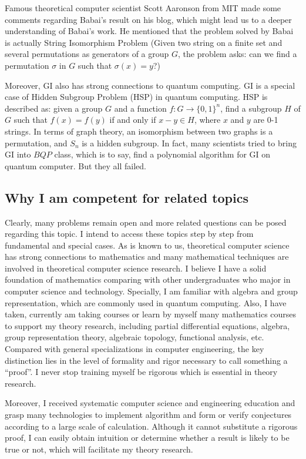 \documentclass[12pt]{article}
\begin{document}
Famous theoretical computer scientist Scott Aaronson from MIT made some comments regarding Babai’s result on his blog\cite{aaronson}, which might lead us to a deeper understanding of Babai’s work. He mentioned that the problem solved by Babai is actually String Isomorphism Problem (Given two string on a finite set and several permutations as generators of a group $G$, the problem asks: can we find a permutation $\sigma$ in $G$ such that $\sigma(x)=y$?) 

Moreover, GI also has strong connections to quantum computing. GI is a special case of Hidden Subgroup Problem (HSP) in quantum computing. HSP is described as: given a group $G$ and a function $f:G \to \{0,1\}^n$, find a subgroup $H$ of $G$ such that $f(x)=f(y)$ if and only if $x-y\in H$, where $x$ and $y$ are 0-1 strings. In terms of graph theory, an isomorphism between two graphs is a permutation, and $S_n$ is a hidden subgroup. In fact, many scientists tried to bring GI into $BQP$ class, which is to say, find a polynomial algorithm for GI on quantum computer. But they all failed. 

\bigskip

\subsection{Why I am competent for related topics}
Clearly, many problems remain open and more related questions can be posed regarding this topic. I intend to access these topics step by step from fundamental and special cases. As is known to us, theoretical computer science has strong connections to mathematics and many mathematical techniques are involved in theoretical computer science research. I believe I have a solid foundation of mathematics comparing with other undergraduates who major in computer science and technology. Specially, I am familiar with algebra and group representation, which are commonly used in quantum computing. Also, I have taken, currently am taking courses or learn by myself many mathematics courses to support my theory research, including partial differential equations, algebra, group representation theory, algebraic topology, functional analysis, etc. Compared with general specializations in computer engineering, the key distinction lies in the level of formality and rigor necessary to call something a “proof”. I never stop training myself be rigorous which is essential in theory research. 

Moreover, I received systematic computer science and engineering education and grasp many technologies to implement algorithm and form or verify conjectures according to a large scale of calculation. Although it cannot substitute a rigorous proof, I can easily obtain intuition or determine whether a result is likely to be true or not, which will facilitate my theory research. 
\end{document}
